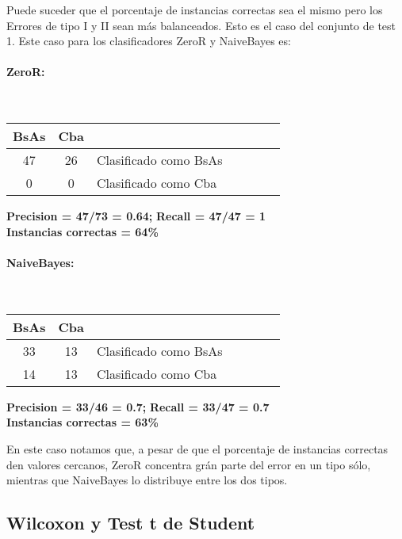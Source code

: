 Puede suceder que el porcentaje de instancias correctas sea el mismo pero los Errores de tipo I y II sean más balanceados. Esto es el caso del conjunto de test 1. Este caso para los clasificadores ZeroR y NaiveBayes es:

\paragraph*{ZeroR:}\mbox{}\\
\begin{table}[H]
\centering
\begin{tabular}{|c|c|l|c|c|c|c|}
\hline
 BsAs & Cba &  \\ \hline
 47 &  26 &  Clasificado como BsAs \\ \hline
 0 &  0 &  Clasificado como Cba \\ \hline
\end{tabular}
\end{table}
\begin{center}
\textbf{Precision = 47/73 = 0.64;} \textbf{Recall = 47/47 = 1}\\
\textbf{Instancias correctas = 64\%}
\end{center}

\paragraph*{NaiveBayes:}\mbox{}\\
\begin{table}[H]
\centering
\begin{tabular}{|c|c|l|c|c|c|c|}
\hline
 BsAs & Cba &  \\ \hline
 33 &  13 &  Clasificado como BsAs \\ \hline
 14 &  13 &  Clasificado como Cba \\ \hline
\end{tabular}
\end{table}
\begin{center}
\textbf{Precision = 33/46 = 0.7;} \textbf{Recall = 33/47 = 0.7}\\
\textbf{Instancias correctas = 63\%}
\end{center}

En este caso notamos que, a pesar de que el porcentaje de instancias correctas den valores cercanos, ZeroR concentra grán parte del error en un tipo sólo, mientras que NaiveBayes lo distribuye entre los dos tipos.

\subsection{Wilcoxon y Test t de Student}

